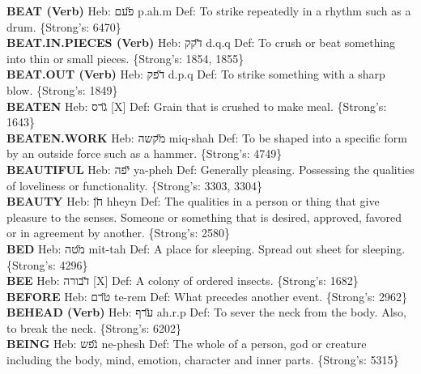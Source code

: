 {\textbf{BEAT (Verb)} Heb: {\large\H פעם} p.ah.m Def: To strike repeatedly in a rhythm such as a drum. \{Strong's: 6470\}\hfill{}\\

\textbf{BEAT.IN.PIECES (Verb)} Heb: {\large\H דקק} d.q.q Def: To crush or beat something into thin or small pieces. \{Strong's: 1854, 1855\}\hfill{}\\

\textbf{BEAT.OUT (Verb)} Heb: {\large\H דפק} d.p.q Def: To strike something with a sharp blow. \{Strong's: 1849\}\hfill{}\\

\textbf{BEATEN} Heb: {\large\H גרס} {[}X{]} Def: Grain that is crushed to make meal. \{Strong's: 1643\}\hfill{}\\

\textbf{BEATEN.WORK} Heb: {\large\H מקשה} miq-shah Def: To be shaped into a specific form by an outside force such as a hammer. \{Strong's: 4749\}\hfill{}\\

\textbf{BEAUTIFUL} Heb: {\large\H יפה} ya-pheh Def: Generally pleasing. Possessing the qualities of loveliness or functionality. \{Strong's: 3303, 3304\}\hfill{}\\

\textbf{BEAUTY} Heb: {\large\H חן} hheyn Def: The qualities in a person or thing that give pleasure to the senses. Someone or something that is desired, approved, favored or in agreement by another. \{Strong's: 2580\}\hfill{}\\

\textbf{BED} Heb: {\large\H מטה} mit-tah Def: A place for sleeping. Spread out sheet for sleeping. \{Strong's: 4296\}\hfill{}\\

\textbf{BEE} Heb: {\large\H דבורה} {[}X{]} Def: A colony of ordered insects. \{Strong's: 1682\}\hfill{}\\

\textbf{BEFORE} Heb: {\large\H טרם} te-rem Def: What precedes another event. \{Strong's: 2962\}\hfill{}\\

\textbf{BEHEAD (Verb)} Heb: {\large\H ערף} ah.r.p Def: To sever the neck from the body. Also, to break the neck. \{Strong's: 6202\}\hfill{}\\

\textbf{BEING} Heb: {\large\H נפש} ne-phesh Def: The whole of a person, god or creature including the body, mind, emotion, character and inner parts. \{Strong's: 5315\}\hfill{}\\

}
